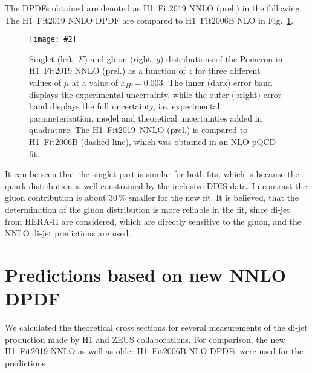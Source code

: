 \documentclass{PoS}
\newcommand{\IP}{I\!\!P}
\newcommand{\includegraphicss}[2][]{\texttt{[image: \#2]}}
\begin{document}
The DPDFs obtained are denoted as H1~Fit2019 NNLO (prel.) in the following. The H1~Fit2019 NNLO DPDF are compared to H1~Fit2006B NLO \cite{Aktas:2006hy} in Fig.~\ref{figDPDF}.
\begin{figure}[tbhp]
\centering
\includegraphicss[trim={0cm 0.5cm 0 1.5cm},clip,width=.7\textwidth]{{{plots/H1prelim-19-013.fig1}}}
\caption{ Singlet (left, $\Sigma$) and gluon (right, $g$) distributions of the Pomeron in H1~Fit2019 NNLO (prel.) as a function of $z$ for three different values of $\mu$ at a value of $x_{\IP} = 0.003$. The inner (dark) error band displays the experimental uncertainty, while the outer (bright) error band displays the full uncertainty, i.e. experimental, parameterisation, model and theoretical uncertainties added in quadrature. The H1~Fit2019~NNLO (prel.) is compared to H1~Fit2006B (dashed line), which was obtained in an NLO pQCD fit.}
\label{figDPDF}
\end{figure}
%
It can be seen that the singlet part is similar for both fits, which is because the quark distribution is well constrained by the inclusive DDIS data.
In contrast the gluon contribution is about 30\,\% smaller for the new fit. It is believed, that the determination of the gluon distribution is more reliable in the fit, since di-jet from HERA-II are considered, which are directly sensitive to the gluon, and the NNLO di-jet predictions are used.


\section{Predictions based on new NNLO DPDF}

We calculated the theoretical cross sections for several measurements of the di-jet production made by H1 and ZEUS collaborations.
For comparison, the new H1~Fit2019 NNLO as well as older H1~Fit2006B NLO DPDFs \cite{Aktas:2006hy} were used for the predictions.
\end{document}
